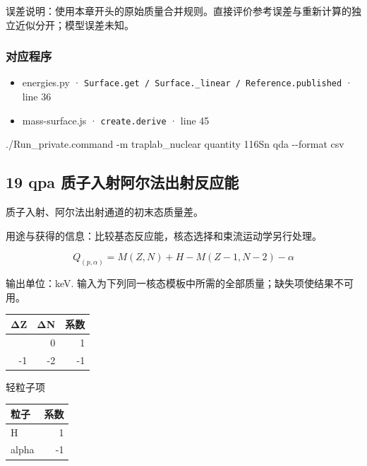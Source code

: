 \documentclass[
  11pt,
  letterpaper,
]{article}
\newenvironment{Shaded}{}{}
\newcommand{\AttributeTok}[1]{\textcolor[rgb]{0.49,0.56,0.16}{#1}}
\newcommand{\ExtensionTok}[1]{#1}
\newcommand{\NormalTok}[1]{#1}
\providecommand{\tightlist}{%
  \setlength{\itemsep}{0pt}\setlength{\parskip}{0pt}}
\begin{document}
误差说明：使用本章开头的原始质量合并规则。直接评价参考误差与重新计算的独立近似分开；模型误差未知。

\subsubsection{对应程序}\label{ux5bf9ux5e94ux7a0bux5e8f-17}

\begin{itemize}
\tightlist
\item
  energies.py ·
  \texttt{Surface.get\ /\ Surface.\_linear\ /\ Reference.published} ·
  line 36
\item
  mass-surface.js · \texttt{create.derive} · line 45
\end{itemize}

\begin{Shaded}
\begin{Highlighting}[]
\ExtensionTok{./Run\_private.command} \AttributeTok{{-}m}\NormalTok{ traplab\_nuclear quantity 116Sn qda }\AttributeTok{{-}{-}format}\NormalTok{ csv}
\end{Highlighting}
\end{Shaded}

\subsection{19 qpa
质子入射阿尔法出射反应能}\label{qpa-ux8d28ux5b50ux5165ux5c04ux963fux5c14ux6cd5ux51faux5c04ux53cdux5e94ux80fd}

质子入射、阿尔法出射通道的初末态质量差。

用途与获得的信息：比较基态反应能，核态选择和束流运动学另行处理。

\[
Q_{(p,\alpha)}=M(Z,N)+H-M(Z-1,N-2)-\alpha
\]

输出单位：keV.
输入为下列同一核态模板中所需的全部质量；缺失项使结果不可用。

\begin{longtable}[]{@{}rrr@{}}
\toprule\noalign{}
ΔZ & ΔN & 系数 \\
\midrule\noalign{}
\endhead
\bottomrule\noalign{}
\endlastfoot
0 & 0 & 1 \\
-1 & -2 & -1 \\
\end{longtable}

轻粒子项

\begin{longtable}[]{@{}lr@{}}
\toprule\noalign{}
粒子 & 系数 \\
\midrule\noalign{}
\endhead
\bottomrule\noalign{}
\endlastfoot
H & 1 \\
alpha & -1 \\
\end{longtable}
\end{document}
